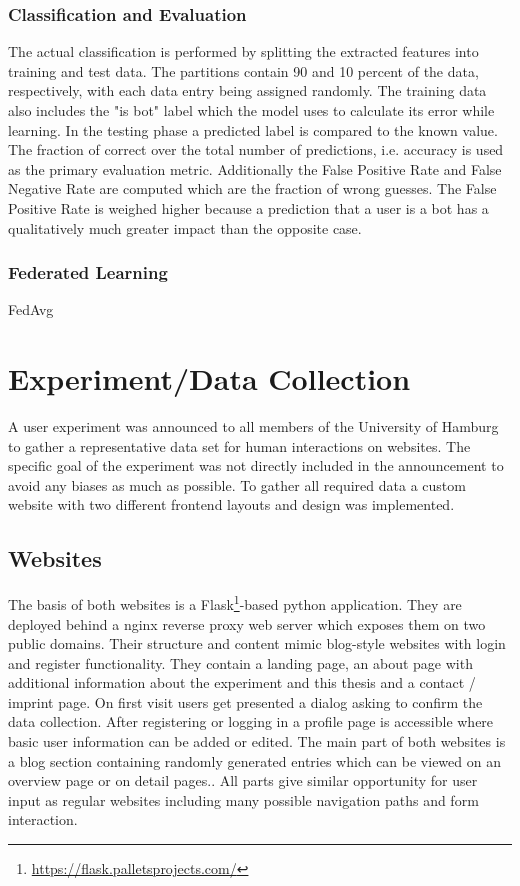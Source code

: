 \documentclass[
    fontsize=12pt,
    headings=small,
    parskip=half,           %
    bibliography=totoc,
    numbers=noenddot,       %
    open=any,               %
    final                   %
]{scrreprt}
\begin{document}
\subsection{Classification and Evaluation}

The actual classification is performed by splitting the extracted features into training and test data. The partitions contain 90 and 10 percent of the data, respectively, with each data entry being assigned randomly. The training data also includes the "is bot" label which the model uses to calculate its error while learning. In the testing phase a predicted label is compared to the known value. The fraction of correct over the total number of predictions, i.e. accuracy is used as the primary evaluation metric. Additionally the False Positive Rate and False Negative Rate are computed which are the fraction of wrong guesses. The False Positive Rate is weighed higher because a prediction that a user is a bot has a qualitatively much greater impact than the opposite case.

\subsection{Federated Learning}

FedAvg


\chapter{Experiment/Data Collection}

A user experiment was announced to all members of the University of Hamburg to gather a representative data set for human interactions on websites. The specific goal of the experiment was not directly included in the announcement to avoid any biases as much as possible. To gather all required data a custom website with two different frontend layouts and design was implemented.

\section{Websites}

The basis of both websites is a Flask\footnote{\url{https://flask.palletsprojects.com/}}-based python application. They are deployed behind a nginx reverse proxy web server which exposes them on two public domains. Their structure and content mimic blog-style websites with login and register functionality. They contain a landing page, an about page with additional information about the experiment and this thesis and a contact / imprint page.
On first visit users get presented a dialog asking to confirm the data collection.
After registering or logging in a profile page is accessible where basic user information can be added or edited. The main part of both websites is a blog section containing randomly generated entries which can be viewed on an overview page or on detail pages..
All parts give similar opportunity for user input as regular websites including many possible navigation paths and form interaction.
\end{document}
